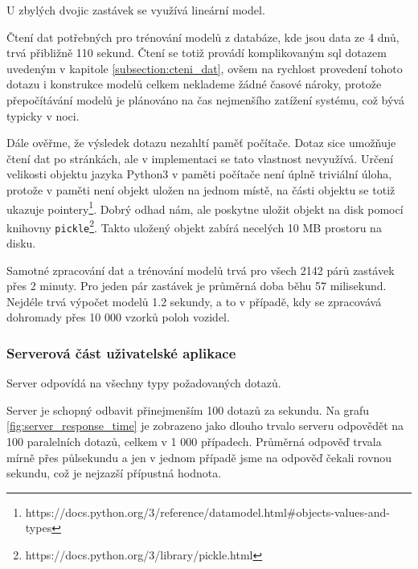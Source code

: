 \bigbreak


U zbylých dvojic zastávek se využívá lineární model.


\bigbreak


Čtení dat potřebných pro trénování modelů z databáze, kde jsou data ze 4 dnů, trvá přibližně 110 sekund. Čtení se totiž provádí komplikovaným \gls{sql} dotazem uvedeným v kapitole \ref{subsection:cteni_dat}, ovšem na rychlost provedení tohoto dotazu i konstrukce modelů celkem neklademe žádné časové nároky, protože přepočítávání modelů je plánováno na čas nejmenšího zatížení systému, což bývá typicky v noci.

\bigbreak


Dále ověřme, že výsledek dotazu nezahltí paměť počítače. Dotaz sice umožňuje čtení dat po stránkách, ale v implementaci se tato vlastnost nevyužívá. Určení velikosti objektu jazyka Python3 v paměti počítače není úplně triviální úloha, protože v paměti není objekt uložen na jednom místě, na části objektu se totiž ukazuje pointery\footnote{https://docs.python.org/3/reference/datamodel.html\#objects-values-and-types}. Dobrý odhad nám, ale poskytne uložit objekt na disk pomocí knihovny \verb-pickle-\footnote{https://docs.python.org/3/library/pickle.html}. Takto uložený objekt zabírá necelých 10 MB prostoru na disku.


\bigbreak


Samotné zpracování dat a trénování modelů trvá pro všech 2142 párů zastávek přes 2 minuty. Pro jeden pár zastávek je průměrná doba běhu 57 milisekund. Nejdéle trvá výpočet modelů 1.2 sekundy, a to v případě, kdy se zpracovává dohromady přes 10 000 vzorků poloh vozidel.


\subsubsection{Serverová část uživatelské aplikace}


Server odpovídá na všechny typy požadovaných dotazů.


\bigbreak


Server je schopný odbavit přinejmenším 100 dotazů za sekundu. Na grafu \ref{fig:server_response_time} je zobrazeno jako dlouho trvalo serveru odpovědět na 100 paralelních dotazů, celkem v 1 000 případech. Průměrná odpověď trvala mírně přes půlsekundu a jen v jednom případě jsme na odpověď čekali rovnou sekundu, což je nejzazší přípustná hodnota.


